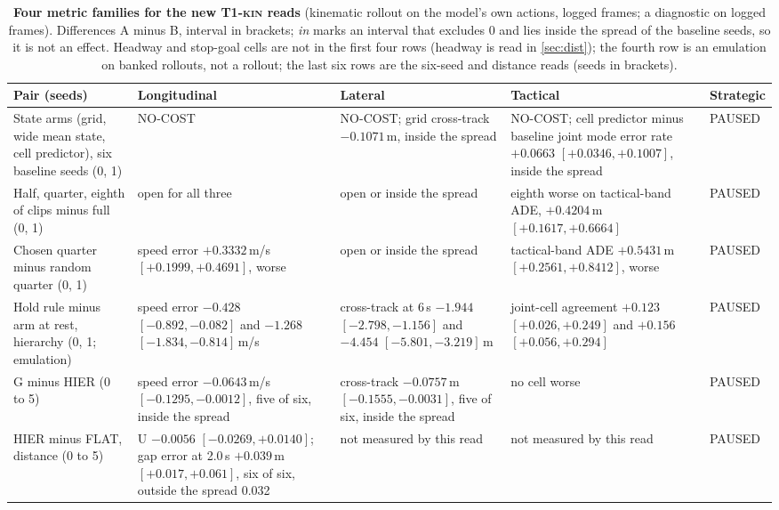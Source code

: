 \documentclass[10pt,twocolumn]{article}
\theoremstyle{remark}
\newcommand{\tier}[1]{\textsc{\small #1}}
\begin{document}
\begin{table}[!tp]
\centering
\caption{\textbf{Four metric families for the new \tier{T1-kin} reads} (kinematic rollout on the model's own actions, logged frames;
a diagnostic on logged frames). Differences A minus B, interval in brackets; \emph{in} marks an interval
that excludes 0 and lies inside the spread of the baseline seeds, so it is not an effect. Headway and stop-goal cells are not in the first four rows (headway is read in \cref{sec:dist}); the fourth row is an emulation on banked rollouts, not a rollout; the last six rows are the six-seed and distance reads (seeds in brackets).}
\label{tab:fam6}
\small
\begin{tabularx}{\textwidth}{@{}>{\raggedright\arraybackslash}p{31mm}>{\raggedright\arraybackslash\hsize=1.2\hsize}X>{\raggedright\arraybackslash\hsize=0.9\hsize}X>{\raggedright\arraybackslash\hsize=0.9\hsize}X>{\raggedright\arraybackslash}p{19mm}@{}}
\toprule
Pair (seeds) & Longitudinal & Lateral & Tactical & Strategic \\
\midrule
State arms (grid, wide mean state, cell predictor), six baseline seeds (0, 1) & NO-COST & NO-COST; grid cross-track $-0.1071$\,m, inside the spread & NO-COST; cell predictor minus baseline joint mode error rate $+0.0663$ $[+0.0346,+0.1007]$, inside the spread & PAUSED \\
Half, quarter, eighth of clips minus full (0, 1) & open for all three & open or inside the spread & eighth worse on tactical-band ADE, $+0.4204$\,m $[+0.1617,+0.6664]$ & PAUSED \\
Chosen quarter minus random quarter (0, 1) & speed error $+0.3332$\,m/s $[+0.1999,+0.4691]$, worse & open or inside the spread & tactical-band ADE $+0.5431$\,m $[+0.2561,+0.8412]$, worse & PAUSED \\
Hold rule minus arm at rest, hierarchy (0, 1; emulation) & speed error $-0.428$ $[-0.892,-0.082]$ and $-1.268$ $[-1.834,-0.814]$\,m/s & cross-track at 6\,s $-1.944$ $[-2.798,-1.156]$ and $-4.454$ $[-5.801,-3.219]$\,m & joint-cell agreement $+0.123$ $[+0.026,+0.249]$ and $+0.156$ $[+0.056,+0.294]$ & PAUSED \\
\midrule
G minus HIER (0 to 5) & speed error $-0.0643$\,m/s $[-0.1295,-0.0012]$, five of six, inside the spread & cross-track $-0.0757$\,m $[-0.1555,-0.0031]$, five of six, inside the spread & no cell worse & PAUSED \\
HIER minus FLAT, distance (0 to 5) & U $-0.0056$ $[-0.0269,+0.0140]$; gap error at 2.0\,s $+0.039$\,m $[+0.017,+0.061]$, six of six, outside the spread 0.032 & not measured by this read & not measured by this read & PAUSED \\

\end{tabularx}
\end{table}
\end{document}
